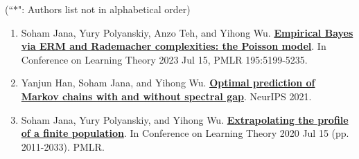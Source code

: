 \documentclass[letterpaper,12pt,oneside]{article}
\theoremstyle{definition}
\begin{document}
			 (``$\ast$": Authors list not in alphabetical order)
			
			\begin{enumerate}
				\item Soham Jana, Yury Polyanskiy, Anzo Teh, and Yihong Wu. \href{https://arxiv.org/abs/2307.02070}{\bf Empirical Bayes via ERM and Rademacher complexities: the Poisson model}. In Conference on Learning Theory 2023 Jul 15, PMLR 195:5199-5235.
				
				\item Yanjun Han, Soham Jana, and Yihong Wu. \href{https://arxiv.org/abs/2106.13947}{\bf Optimal prediction of Markov chains with and without spectral gap}. NeurIPS 2021.
				
				\item Soham Jana, Yury Polyanskiy, and Yihong Wu. \href{https://arxiv.org/abs/2005.10561}{\bf Extrapolating the profile of a finite population}. In Conference on Learning Theory 2020 Jul 15 (pp. 2011-2033). PMLR.
			\end{enumerate}
			
\end{document}
